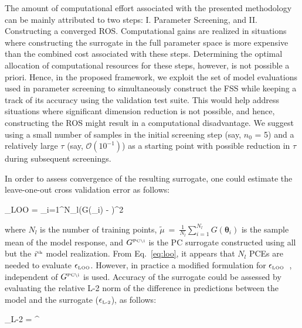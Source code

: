 The amount of computational effort associated with the presented methodology can be mainly attributed to
two steps: I. Parameter Screening, and II. Constructing a converged ROS. Computational gains are realized
in situations where constructing the surrogate in the full parameter space is more expensive than the combined cost
associated with these steps. Determining the optimal allocation of computational resources for these steps, however, 
is not possible a priori. Hence, in the proposed framework, we exploit the set of model evaluations used
in parameter screening to simultaneously construct the FSS while keeping a track of its accuracy using the
validation test suite. This would help address situations where significant dimension
reduction is not possible, and hence, constructing the ROS might result in a computational disadvantage. We
suggest using a small number of samples in the initial screening step (say, $n_0$ = 5) and a relatively large
$\tau$ (say, $\mathcal{O}(10^{-1})$) as a starting point with possible reduction in $\tau$ during
subsequent screenings. 

In order to assess convergence of the resulting surrogate, one could estimate the leave-one-out cross 
validation error as follows:

\be
\epsilon_{\mbox{\tiny LOO}} = 
{\sum\limits_{i=1}^{N_l}\left(G(\bm{\theta}_i) - \widetilde{\mu}\right)^2}
\label{eq:loo}
\ee

\noindent where $N_l$ is the number of training points, 
$\widetilde{\mu}~=~\frac{1}{N_l}\sum\limits_{i=1}^{N_l} G(\bm{\theta}_i)$
is the sample mean of the model response, and $ G^{\mbox{\tiny {PC}\textbackslash i}}$
is the PC surrogate constructed using all but the $i^{\mbox{\tiny{th}}}$ model realization. 
From Eq.~\ref{eq:loo}, it appears that $N_l$ PCEs are needed to evaluate $\epsilon_{\mbox{\tiny LOO}}$.
However, in practice a modified formulation for $\epsilon_{\mbox{\tiny LOO}}$~\cite{Blatman:2009},
independent of $G^{\mbox{\tiny {PC}\textbackslash i}}$ is used. Accuracy of the
surrogate could be assessed by evaluating the relative L-2 norm of the difference in predictions
between the model and the surrogate ($\epsilon_{\mbox{\tiny{L-2}}}$), as follows:

\be
\epsilon_{\mbox{\tiny{L-2}}} = 
{\left[\sum\limits_{i=1}^{N_v}\left(G(\bm{\theta}_i)\right)^2\right]^{}}
\label{eq:l2}
\ee

